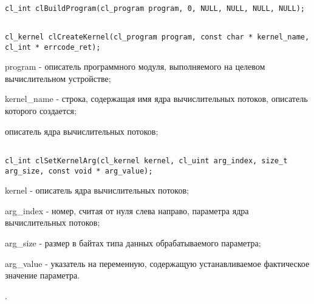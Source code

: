 \begin{enumerate}


\begin{lstlisting}

cl_int clBuildProgram(cl_program program, 0, NULL, NULL, NULL, NULL);

\end{lstlisting}




\begin{lstlisting}

cl_kernel clCreateKernel(cl_program program, const char * kernel_name, cl_int * errcode_ret);

\end{lstlisting}

		\openclend
		{
			\item program - описатель программного модуля, выполняемого на целевом вычислительном устройстве;
			\item kernel\_name - строка, содержащая имя ядра вычислительных потоков, описатель которого создается;
			\errcode
		}
		{описатель ядра вычислительных потоков;}



\begin{lstlisting}

cl_int clSetKernelArg(cl_kernel kernel, cl_uint arg_index, size_t arg_size, const void * arg_value);

\end{lstlisting}

		\openclend
		{
			\item kernel - описатель ядра вычислительных потоков;
			\item arg\_index - номер, считая от нуля слева направо, параметра ядра вычислительных потоков;
			\item arg\_size - размер в байтах типа данных обрабатываемого параметра;
			\item arg\_value - указатель на переменную, содержащую устанавливаемое фактическое значение параметра.
		}
		{\openclsuccess.}


\end{enumerate}
